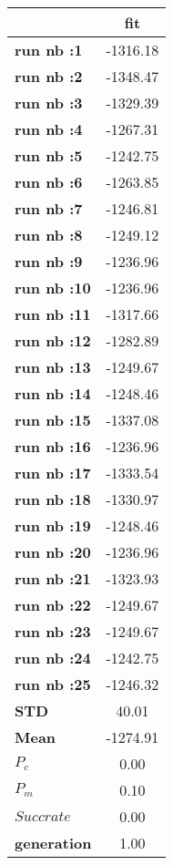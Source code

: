 \begin{tiny}\begin{tabular}{|l|c|}
\hline
&\textbf{fit}\\\hline
\textbf{run nb :1}&-1316.18\\\hline
\textbf{run nb :2}&-1348.47\\\hline
\textbf{run nb :3}&-1329.39\\\hline
\textbf{run nb :4}&-1267.31\\\hline
\textbf{run nb :5}&-1242.75\\\hline
\textbf{run nb :6}&-1263.85\\\hline
\textbf{run nb :7}&-1246.81\\\hline
\textbf{run nb :8}&-1249.12\\\hline
\textbf{run nb :9}&-1236.96\\\hline
\textbf{run nb :10}&-1236.96\\\hline
\textbf{run nb :11}&-1317.66\\\hline
\textbf{run nb :12}&-1282.89\\\hline
\textbf{run nb :13}&-1249.67\\\hline
\textbf{run nb :14}&-1248.46\\\hline
\textbf{run nb :15}&-1337.08\\\hline
\textbf{run nb :16}&-1236.96\\\hline
\textbf{run nb :17}&-1333.54\\\hline
\textbf{run nb :18}&-1330.97\\\hline
\textbf{run nb :19}&-1248.46\\\hline
\textbf{run nb :20}&-1236.96\\\hline
\textbf{run nb :21}&-1323.93\\\hline
\textbf{run nb :22}&-1249.67\\\hline
\textbf{run nb :23}&-1249.67\\\hline
\textbf{run nb :24}&-1242.75\\\hline
\textbf{run nb :25}&-1246.32\\\hline
\textbf{STD}&40.01\\\hline
\textbf{Mean}&-1274.91\\\hline
\textbf{$P_c$}&0.00\\\hline
\textbf{$P_{m}$}&0.10\\\hline
\textbf{$Succ rate$}&0.00\\\hline
\textbf{generation}&1.00\\\hline
\end{tabular}
\end{tiny}